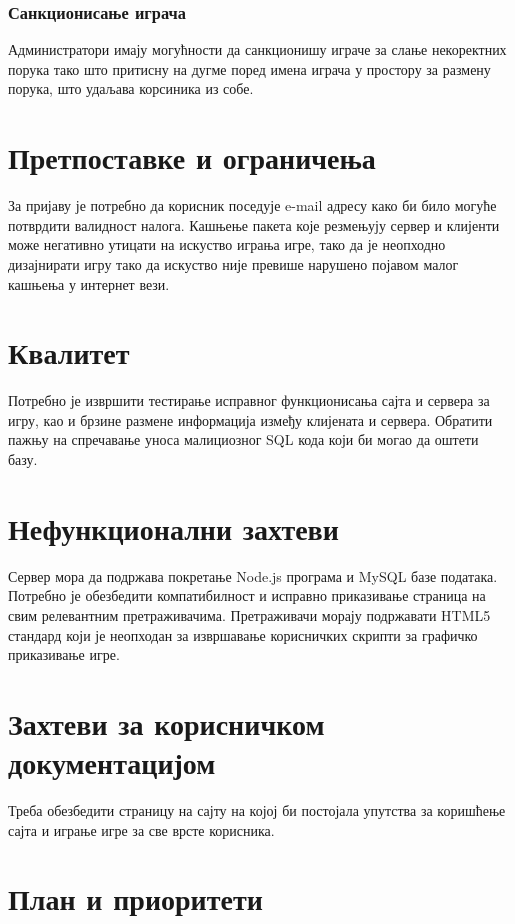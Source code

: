 \subsubsection{Санкционисање играча}
Администратори имају могућности да санкционишу играче за слање некоректних порука тако што притисну на дугме поред
имена играча у простору за размену порука, што удаљава корсиника из собе.



\section{Претпоставке и ограничења}
За пријаву је потребно да корисник поседује e-mail адресу како би било могуће потврдити валидност налога.
Кашњење пакета које резмењују сервер и клијенти може негативно утицати на искуство играња игре, тако да је
неопходно дизајнирати игру тако да искуство није превише нарушено појавом малог кашњења у интернет вези.



\section{Квалитет}
Потребно је извршити тестирање исправног функционисања сајта и сервера за игру, као и брзине размене информација
између клијената и сервера. Обратити пажњу на спречавање уноса малициозног SQL кода који би могао да оштети базу.



\section{Нефункционални захтеви}
Сервер мора да подржава покретање Node.js програма и MySQL базе података. Потребно је обезбедити компатибилност 
и исправно приказивање страница на свим релевантним претраживачима. Претраживачи морају подржавати HTML5 стандард
који је неопходан за извршавање корисничких скрипти за графичко приказивање игре.



\section{Захтеви за корисничком документацијом}
Треба обезбедити страницу на сајту на којој би постојала упутства за коришћење сајта и играње игре за све врсте
корисника.



\section{План и приоритети}

